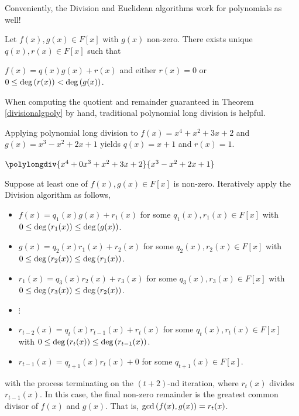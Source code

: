 \documentclass[11pt,fleqn,dvipsnames,usenames]{article}
\newcommand{\p}{\noindent}
\begin{document}
%
\p Conveniently, the Division and Euclidean algorithms work for polynomials as well!
%
\begin{theorem}\label{divisionalgpoly}
Let $f(x),g(x)\in F[x]$ with $g(x)$ non-zero.  There exists unique $q(x),r(x)\in F[x]$ such that
\begin{center}
$f(x) = q(x)g(x) + r(x)$ and either $r(x) = 0$ or $0\leq \text{deg}\left(r(x)\right) < \text{deg}\left(g(x)\right)$.
\end{center}
\end{theorem}
%
\begin{remark}
When computing the quotient and remainder guaranteed in Theorem \ref{divisionalgpoly} by hand, traditional polynomial long division is helpful.
\end{remark}
%
\begin{example} Applying polynomial long division to $f(x) = x^4 + x^2 + 3x + 2$ and $g(x) = x^3 - x^2 + 2x + 1$ yields $q(x) = x + 1$ and $r(x) = 1$.
\vsp

\begin{center}
$\polylongdiv{x^4 + 0x^3 + x^2 + 3x + 2}{x^3 - x^2 + 2x + 1}$
\end{center}
\end{example}
\vsp
%
\begin{theorem}\label{euclideanpoly}
Suppose at least one of $f(x),g(x)\in F[x]$ is non-zero.  Iteratively apply the Division algorithm as follows,
\begin{itemize}[\ ]
\item $f(x) = q_1(x)g(x) + r_1(x)$ for some $q_1(x),r_1(x)\in F[x]$ with $0\leq \text{deg}\left(r_{1}(x)\right)\leq \text{deg}\left(g(x)\right)$.
\item $g(x) = q_2(x)r_{1}(x) + r_2(x)$ for some $q_2(x),r_2(x)\in F[x]$ with $0\leq \text{deg}\left(r_{2}(x)\right)\leq \text{deg}\left(r_{1}(x)\right)$.
\item $r_{1}(x) = q_3(x)r_{2}(x) + r_3(x)$ for some $q_3(x),r_3(x)\in F[x]$ with $0\leq \text{deg}\left(r_{3}(x)\right)\leq \text{deg}\left(r_{2}(x)\right)$.
\item {}$\vdots$
\item $r_{t-2}(x) = q_{t}(x)r_{t-1}(x) + r_{t}(x)$ for some $q_{t}(x),r_{t}(x)\in F[x]$ with $0\leq \text{deg}\left(r_{t}(x)\right)\leq \text{deg}\left(r_{t-1}(x)\right)$.
\item $r_{t-1}(x) = q_{t+1}(x)r_{t}(x) + 0$ for some $q_{t+1}(x)\in F[x]$.
\end{itemize}
with the process terminating on the $(t+2)$-nd iteration, where $r_{t}(x)$ divides $r_{t-1}(x)$.  In this case, the final non-zero remainder is the greatest common divisor of $f(x)$ and $g(x)$.  That is, $\text{gcd}\left(f(x),g(x)\right) = r_{t}(x)$.
\end{theorem}
\end{document}

